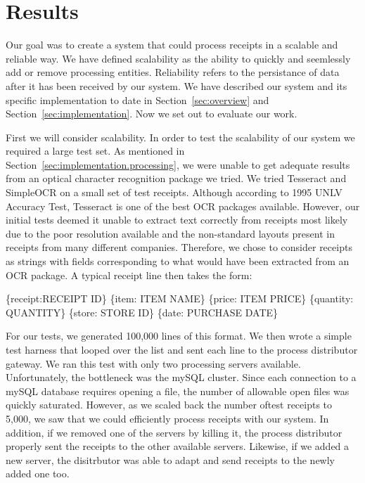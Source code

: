 \section{Results}
\label{sec:results}

Our goal was to create a system that could process receipts in a
scalable and reliable way. We have defined scalability as the ability
to quickly and seemlessly add or remove processing
entities. Reliability refers to the persistance of data after it has
been received by our system. We have described our system and its
specific implementation to date in Section~\ref{sec:overview} and
Section~\ref{sec:implementation}. Now we set out to evaluate our work.

First we will consider scalability. In order to test the scalability
of our system we required a large test set. As mentioned in
Section~\ref{sec:implementation.processing}, we were unable to get
adequate results from an optical character recognition package we
tried. We tried Tesseract and SimpleOCR on a small set of test
receipts. Although according to 1995 UNLV Accuracy Test, Tesseract is
one of the best OCR packages available. However, our initial tests
deemed it unable to extract text correctly from receipts most likely
due to the poor resolution available and the non-standard layouts
present in receipts from many different companies. Therefore, we chose to consider receipts as strings with fields corresponding to what would have been extracted from an OCR package. A typical receipt line then takes the form:

\begin{centering}
\{receipt:RECEIPT ID\} \{item: ITEM NAME\} \{price: ITEM PRICE\} \{quantity: QUANTITY\} \{store: STORE ID\} \{date: PURCHASE DATE\}
\end{centering}

For our tests, we generated 100,000 lines of this format. We then
wrote a simple test harness that looped over the list and sent each
line to the process distributor gateway. We ran this test with only
two processing servers available. Unfortunately, the bottleneck was
the mySQL cluster. Since each connection to a mySQL database requires
opening a file, the number of allowable open files was quickly
saturated. However, as we scaled back the number oftest receipts to
5,000, we saw that we could efficiently process receipts with our
system. In addition, if we removed one of the servers by killing it,
the process distributor properly sent the receipts to the other
available servers. Likewise, if we added a new server, the disitrbutor
was able to adapt and send receipts to the newly added one too.

